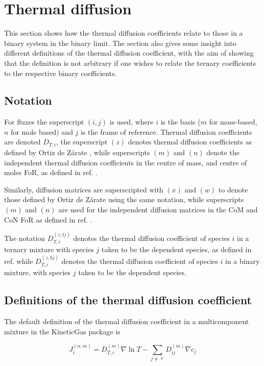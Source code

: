 \section{Thermal diffusion}

This section shows how the thermal diffusion coefficients relate to those in a binary system in the binary limit. The section also gives some insight into different definitions of the thermal diffusion coefficient, with the aim of showing that the definition is not arbitrary if one wishes to relate the ternary coefficients to the respective binary coefficients.

\subsection{Notation}

For fluxes the superscript $(i, j)$ is used, where $i$ is the basis ($m$ for mass-based, $n$ for mole based) and $j$ is the frame of reference. Thermal diffusion coefficients are denoted $D_{T, i}$, the superscript $(z)$ denotes thermal diffusion coefficients as defined by Ortiz de Zárate \cite{ortiz2019definition}, while superscripts $(m)$ and $(n)$ denote the independent thermal diffusion coefficients in the centre of mass, and centre of moles FoR, as defined in ref. \cite{retmie}. 

Similarly, diffusion matrices are superscripted with $(x)$ and $(w)$ to denote those defined by Ortiz de Zárate using the same notation, while superscripts $(m)$ and $(n)$ are used for the independent diffusion matrices in the CoM and CoN FoR as defined in ref. \cite{retmie}.

The notation $D_{T,i}^{(z,tj)}$ denotes the thermal diffusion coefficient of species $i$ in a ternary mixture with species $j$ taken to be the dependent species, as defined in ref. \cite{ortiz2019definition} while $D_{T,i}^{(z,bj)}$ denotes the thermal diffusion coefficient of species $i$ in a binary mixture, with species $j$ taken to be the dependent species.

\subsection{Definitions of the thermal diffusion coefficient}

The default definition of the thermal diffusion coefficient in a multicomponent mixture in the KineticGas package is

\begin{equation}
    J_i^{(n,m)} = D_{T,i}^{(m)} \nabla \ln T - \sum_{j \neq \ell} D_{ij}^{(m)} \nabla c_j
\end{equation}

